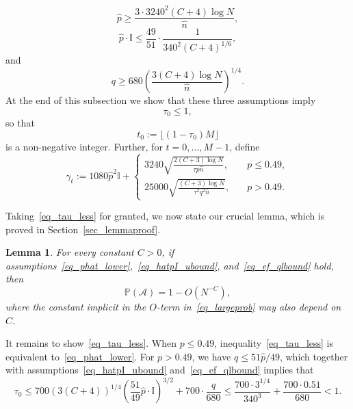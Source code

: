 \documentclass[12pt,reqno]{amsart}
\newcommand{\ac}{{\mathcal{A}}}
\newcommand{\Prob} {\mathbb {P}}
\newcommand{\prob}[1]{\Prob\left(#1\right)}
\newcommand{\I} {\mathbb I}
\newtheorem{lemma}[theorem]{Lemma}
\theoremstyle{definition}
\begin{document}
\begin{equation}
	 \hat p \ge \frac{3 \cdot 3240^2(C+4)\log N}{\hat n},	
	\label{eq_phat_lower}
\end{equation}
\begin{equation}
  \label{eq_hatpI_ubound}
	\hat p \cdot \I \le \frac{49}{51}\cdot\frac1{340^2 (C + 4)^{1/6}},
	\end{equation}
and
\begin{equation}
  \label{eq_ef_qlbound}
  q \ge 680\left( \frac{3(C+4)\log N}{\hat{n}}\right)^{1/4}.
	\end{equation}
At the end of this subsection we show that these three assumptions imply
\begin{equation}
  \label{eq_tau_less}
	\tau_0 \le 1,
\end{equation}
so that
\begin{equation*}
	t_0 := \lfloor (1 - \tau_0)M \rfloor
\end{equation*}
is a non-negative integer.
Further, for $t = 0, \dots, M - 1$, define
\begin{equation}
  \label{eq_gamma_t}
	\gamma_t := 1080 \hat p^2 \I +
	\begin{cases}
		3240 \sqrt{\frac{2(C + 3)\log N}{\tau p \hat n}}, \quad & p \le 0.49, \\
	 25000  \sqrt{\frac{(C + 3)\log N}{ \tau^2q^2 \hat n}}
	, \quad & p > 0.49.
	\end{cases}
\end{equation}





Taking~\eqref{eq_tau_less}
for granted, we now state our crucial lemma, which is proved in Section~\ref{sec_lemmaproof}.

\begin{lemma}
\label{lem_Stanislaw}
For every constant $C > 0$, if assumptions~\eqref{eq_phat_lower},~\eqref{eq_hatpI_ubound}, and~\eqref{eq_ef_qlbound} hold, then
\begin{equation}
  \label{eq_largeprob}
  \prob{\ac} = 1- O(N^{-C}),
\end{equation}
where the constant implicit in the $O$-term in~\eqref{eq_largeprob} may also depend on $C$.
\end{lemma}

\medskip

It remains to show~\eqref{eq_tau_less}.
When $p \le 0.49$, inequality~\eqref{eq_tau_less} is equivalent to~\eqref{eq_phat_lower}. For $p > 0.49$, we have $q \le 51\hat p/49$, which together with assumptions~\eqref{eq_hatpI_ubound} and~\eqref{eq_ef_qlbound} implies that
\[
	\tau_0 \le 700 \left( 3(C+4) \right)^{1/4} \left( \frac{51}{49}\hat p \cdot \I \right)^{3/2} + 700 \cdot \frac{q}{680} \le \frac{700 \cdot 3^{1/4}}{340^3} + \frac{700 \cdot 0.51}{680} < 1.
\]
\end{document}
